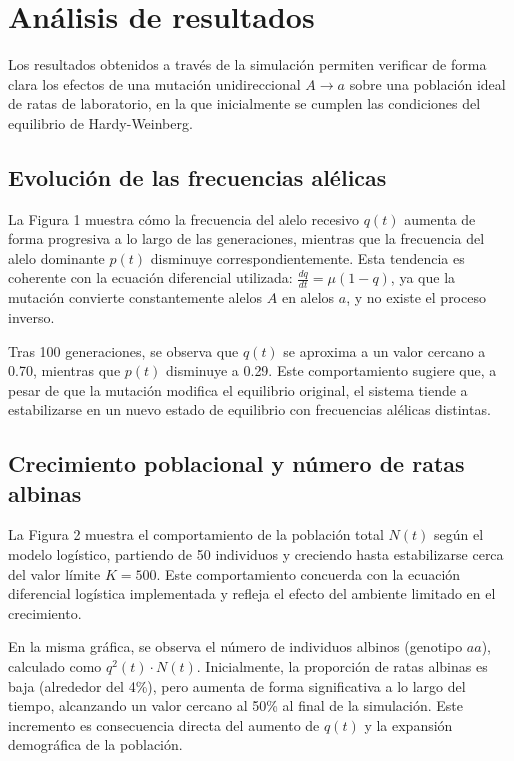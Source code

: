 \documentclass[12pt]{article}
\begin{document}
\section{Análisis de resultados}

Los resultados obtenidos a través de la simulación permiten verificar de forma clara los efectos de una mutación unidireccional $A \rightarrow a$ sobre una población ideal de ratas de laboratorio, en la que inicialmente se cumplen las condiciones del equilibrio de Hardy-Weinberg.

\subsection*{Evolución de las frecuencias alélicas}

La Figura 1 muestra cómo la frecuencia del alelo recesivo $q(t)$ aumenta de forma progresiva a lo largo de las generaciones, mientras que la frecuencia del alelo dominante $p(t)$ disminuye correspondientemente. Esta tendencia es coherente con la ecuación diferencial utilizada: \(\frac{dq}{dt} = \mu(1 - q)\), ya que la mutación convierte constantemente alelos $A$ en alelos $a$, y no existe el proceso inverso.

Tras 100 generaciones, se observa que $q(t)$ se aproxima a un valor cercano a 0.70, mientras que $p(t)$ disminuye a 0.29. Este comportamiento sugiere que, a pesar de que la mutación modifica el equilibrio original, el sistema tiende a estabilizarse en un nuevo estado de equilibrio con frecuencias alélicas distintas.

\subsection*{Crecimiento poblacional y número de ratas albinas}

La Figura 2 muestra el comportamiento de la población total $N(t)$ según el modelo logístico, partiendo de 50 individuos y creciendo hasta estabilizarse cerca del valor límite $K = 500$. Este comportamiento concuerda con la ecuación diferencial logística implementada y refleja el efecto del ambiente limitado en el crecimiento.

En la misma gráfica, se observa el número de individuos albinos (genotipo $aa$), calculado como $q^2(t) \cdot N(t)$. Inicialmente, la proporción de ratas albinas es baja (alrededor del 4\%), pero aumenta de forma significativa a lo largo del tiempo, alcanzando un valor cercano al 50\% al final de la simulación. Este incremento es consecuencia directa del aumento de $q(t)$ y la expansión demográfica de la población.
\end{document}

